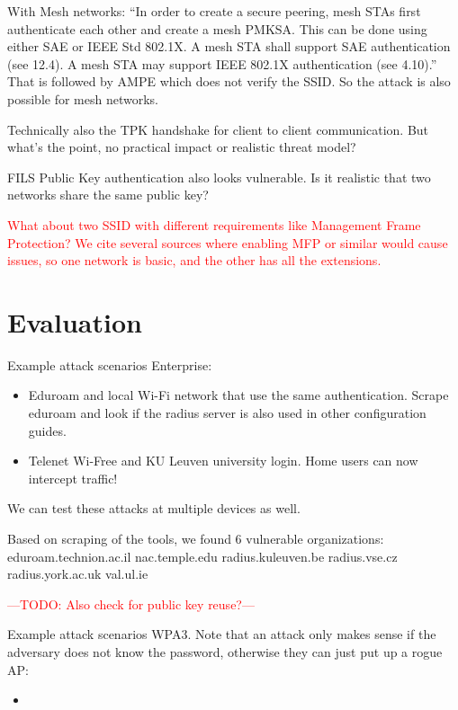 \documentclass[sigconf,review]{acmart}
\newcommand{\wifi}{\mbox{Wi-Fi}}
\DeclareRobustCommand{\red}[1]{\textcolor{red}{#1}}
\begin{document}
With Mesh networks: ``In order to create a secure peering, mesh STAs first authenticate each other and create a mesh PMKSA. This can be done using either SAE or IEEE Std 802.1X. A mesh STA shall support SAE authentication (see 12.4). A mesh STA may support IEEE 802.1X authentication (see 4.10).''
That is followed by AMPE which does not verify the SSID.
So the attack is also possible for mesh networks.

Technically also the TPK handshake for client to client communication.
But what's the point, no practical impact or realistic threat model?

FILS Public Key authentication also looks vulnerable.
Is it realistic that two networks share the same public key?

\red{
What about two SSID with different requirements like Management Frame Protection?
We cite several sources where enabling MFP or similar would cause issues, so one network is basic, and the other has all the extensions.}

\section{Evaluation}
\label{sec:evaluation}

Example attack scenarios Enterprise:
\begin{itemize}
	\item Eduroam and local \wifi{} network that use the same authentication.
	Scrape eduroam and look if the radius server is also used in other configuration guides.
	\item Telenet Wi-Free and KU Leuven university login.
	Home users can now intercept traffic!
\end{itemize}

We can test these attacks at multiple devices as well.

Based on scraping of the tools, we found 6 vulnerable organizations:
eduroam.technion.ac.il
nac.temple.edu
radius.kuleuven.be
radius.vse.cz
radius.york.ac.uk
val.ul.ie

\red{---TODO: Also check for public key reuse?---}

Example attack scenarios WPA3.
Note that an attack only makes sense if the adversary does not know the password, otherwise they can just put up a rogue AP:
\begin{itemize}
	\item 
\end{itemize}
\end{document}
